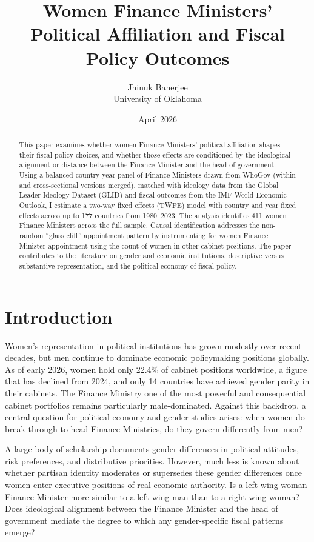 \documentclass[12pt]{article}
\title{Women Finance Ministers' Political Affiliation and Fiscal Policy Outcomes}
\author{Jhinuk Banerjee\\
        University of Oklahoma}
\date{April 2026}
\begin{document}
\maketitle

\begin{abstract}
This paper examines whether women Finance Ministers' political affiliation shapes
their fiscal policy choices, and whether those effects are conditioned by the
ideological alignment or distance between the Finance Minister and the head of
government. Using a balanced country-year panel of Finance Ministers drawn from
WhoGov (within and cross-sectional versions merged), matched with ideology data
from the Global Leader Ideology Dataset (GLID) and fiscal outcomes from the IMF
World Economic Outlook, I estimate a two-way fixed effects (TWFE) model with
country and year fixed effects across up to 177 countries from 1980--2023.
The analysis identifies 411 women Finance Ministers across the full sample.
Causal identification addresses the non-random ``glass cliff'' appointment
pattern by instrumenting for women Finance Minister appointment using the count
of women in other cabinet positions. The paper contributes to the literature
on gender and economic institutions, descriptive versus substantive representation,
and the political economy of fiscal policy.
\end{abstract}

\newpage

\section{Introduction}
\label{sec:intro}

Women's representation in political institutions has grown modestly over recent
decades, but men continue to dominate economic policymaking positions globally.
As of early 2026, women hold only 22.4\% of cabinet positions worldwide, a
figure that has declined from 2024, and only 14 countries have achieved gender
parity in their cabinets. The Finance Ministry one of the most powerful and
consequential cabinet portfolios remains particularly male-dominated. Against
this backdrop, a central question for political economy and gender studies
arises: when women do break through to head Finance Ministries, do they govern
differently from men?

A large body of scholarship documents gender differences in political attitudes,
risk preferences, and distributive priorities. However, much less is known about
whether partisan identity moderates or supersedes these gender differences once
women enter executive positions of real economic authority. Is a left-wing woman
Finance Minister more similar to a left-wing man than to a right-wing woman?
Does ideological alignment between the Finance Minister and the head of government
mediate the degree to which any gender-specific fiscal patterns emerge?
\end{document}
